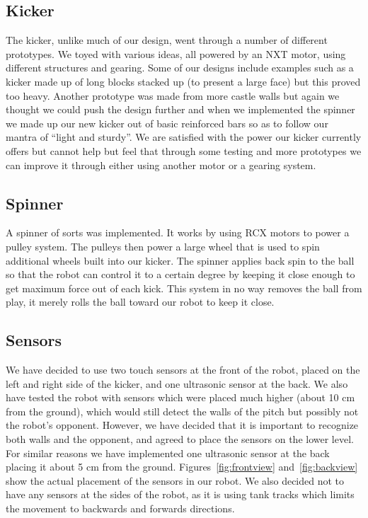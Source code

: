 \documentclass[12pt, a4paper, titlepage]{article}
\begin{document}
\subsection{Kicker}

The kicker, unlike much of our design, went through a number of different
prototypes. We toyed with various ideas, all powered by an NXT motor, using
different structures and gearing. Some of our designs include examples such as
a kicker made up of long blocks stacked up (to present a large face) but this
proved too heavy. Another prototype was made from more castle walls but again we
thought we could push the design further and when we implemented the spinner we
made up our new kicker out of basic reinforced bars so as to follow our mantra
of ``light and sturdy''. We are satisfied with the power our kicker currently
offers but cannot help but feel that through some testing and more prototypes we
can improve it through either using another motor or a gearing system.

\subsection{Spinner}

A spinner of sorts was implemented. It works by using RCX motors to power
a pulley system. The pulleys then power a large wheel that is used to spin
additional wheels built into our kicker. The spinner applies back spin to the
ball so that the robot can control it to a certain degree by keeping it close
enough to get maximum force out of each kick. This system in no way removes the
ball from play, it merely rolls the ball toward our robot to keep it close.

\subsection{Sensors}

We have decided to use two touch sensors at the front of the robot, placed on
the left and right side of the kicker, and one ultrasonic sensor at the back.
We also have tested the robot with sensors which were placed much higher (about
10 cm from the ground), which would still detect the walls of the pitch but
possibly not the robot's opponent. However, we have decided that it is important
to recognize both walls and the opponent, and agreed to place the sensors on
the lower level. For similar reasons we have implemented one ultrasonic sensor
at the back placing it about 5 cm from the ground. Figures~\ref{fig:frontview}
and~\ref{fig:backview} show the actual placement of the sensors in our robot. We
also decided not to have any sensors at the sides of the robot, as it is using
tank tracks which limits the movement to backwards and forwards directions.
\end{document}

